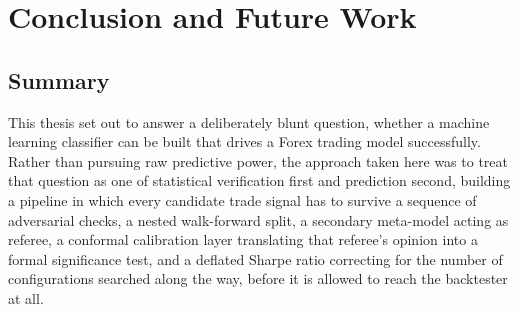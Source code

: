 \documentclass[12pt, a4paper]{article}
\begin{document}
\section{Conclusion and Future Work}
\subsection{Summary}

This thesis set out to answer a deliberately blunt question, whether a machine learning classifier can be built that drives a Forex trading model successfully. Rather than pursuing 
raw predictive power, the approach taken here was to treat that question as one of statistical verification first and prediction second, building a pipeline in which every candidate 
trade signal has to survive a sequence of adversarial checks, a nested walk-forward split, a secondary meta-model acting as referee, a conformal calibration layer 
translating that referee's opinion into a formal significance test, and a deflated Sharpe ratio correcting for the number of configurations searched along the way, before it is 
allowed to reach the backtester at all.

\medskip
\end{document}
